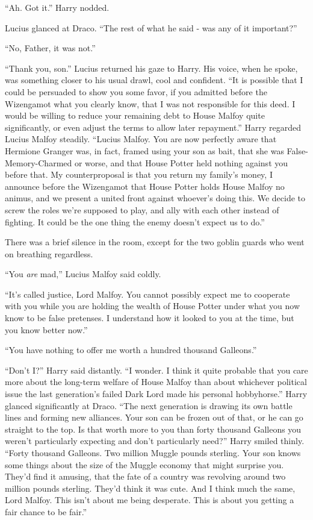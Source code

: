 ``Ah. Got it.'' Harry nodded.

Lucius glanced at Draco. ``The rest of what he said - was any of it important?''

``No, Father, it was not.''

``Thank you, son.'' Lucius returned his gaze to Harry. His voice, when he spoke, was something closer to his usual drawl, cool and confident.
``It is possible that I could be persuaded to show you some favor, if you admitted before the Wizengamot what you clearly know, that I was not responsible for this deed. I would be willing to reduce your remaining debt to House Malfoy quite significantly, or even adjust the terms to allow later repayment.''
Harry regarded Lucius Malfoy steadily. ``Lucius Malfoy. You are now perfectly aware that Hermione Granger was, in fact, framed using your son as bait, that she was False-Memory-Charmed or worse, and that House Potter held nothing against you before that. My counterproposal is that you return my family's money, I announce before the Wizengamot that House Potter holds House Malfoy no animus, and we present a united front against whoever's doing this. We decide to screw the roles we're supposed to play, and ally with each other instead of fighting. It could be the one thing the enemy doesn't expect us to do.''

There was a brief silence in the room, except for the two goblin guards who went on breathing regardless.

``You \emph{are} mad,'' Lucius Malfoy said coldly.

``It's called justice, Lord Malfoy. You cannot possibly expect me to cooperate with you while you are holding the wealth of House Potter under what you now know to be false pretenses. I understand how it looked to you at the time, but you know better now.''

``You have nothing to offer me worth a hundred thousand Galleons.''

``Don't I?'' Harry said distantly. ``I wonder. I think it quite probable that you care more about the long-term welfare of House Malfoy than about whichever political issue the last generation's failed Dark Lord made his personal hobbyhorse.'' Harry glanced significantly at Draco. ``The next generation is drawing its own battle lines and forming new alliances. Your son can be frozen out of that, or he can go straight to the top. Is that worth more to you than forty thousand Galleons you weren't particularly expecting and don't particularly need?'' Harry smiled thinly. ``Forty thousand Galleons. Two million Muggle pounds sterling. Your son knows some things about the size of the Muggle economy that might surprise you. They'd find it amusing, that the fate of a country was revolving around two million pounds sterling. They'd think it was cute. And I think much the same, Lord Malfoy. This isn't about me being desperate. This is about you getting a fair chance to be fair.''

